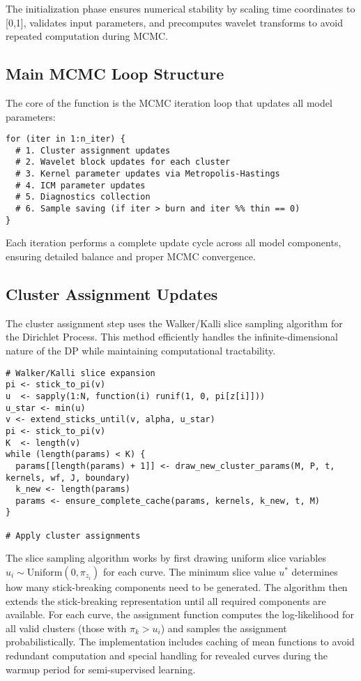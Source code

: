 \documentclass[11pt]{article}
\begin{document}
The initialization phase ensures numerical stability by scaling time coordinates to [0,1], validates input parameters, and precomputes wavelet transforms to avoid repeated computation during MCMC.

\subsection{Main MCMC Loop Structure}

The core of the function is the MCMC iteration loop that updates all model parameters:

\begin{lstlisting}
for (iter in 1:n_iter) {
  # 1. Cluster assignment updates
  # 2. Wavelet block updates for each cluster
  # 3. Kernel parameter updates via Metropolis-Hastings
  # 4. ICM parameter updates
  # 5. Diagnostics collection
  # 6. Sample saving (if iter > burn and iter %% thin == 0)
}
\end{lstlisting}

Each iteration performs a complete update cycle across all model components, ensuring detailed balance and proper MCMC convergence.

\subsection{Cluster Assignment Updates}

The cluster assignment step uses the Walker/Kalli slice sampling algorithm for the Dirichlet Process. This method efficiently handles the infinite-dimensional nature of the DP while maintaining computational tractability.

\begin{lstlisting}
# Walker/Kalli slice expansion
pi <- stick_to_pi(v)
u  <- sapply(1:N, function(i) runif(1, 0, pi[z[i]]))
u_star <- min(u)
v <- extend_sticks_until(v, alpha, u_star)
pi <- stick_to_pi(v)
K  <- length(v)
while (length(params) < K) {
  params[[length(params) + 1]] <- draw_new_cluster_params(M, P, t, kernels, wf, J, boundary)
  k_new <- length(params)
  params <- ensure_complete_cache(params, kernels, k_new, t, M)
}

# Apply cluster assignments
\end{lstlisting}

The slice sampling algorithm works by first drawing uniform slice variables $u_i \sim \text{Uniform}(0, \pi_{z_i})$ for each curve. The minimum slice value $u^*$ determines how many stick-breaking components need to be generated. The algorithm then extends the stick-breaking representation until all required components are available. For each curve, the assignment function computes the log-likelihood for all valid clusters (those with $\pi_k > u_i$) and samples the assignment probabilistically. The implementation includes caching of mean functions to avoid redundant computation and special handling for revealed curves during the warmup period for semi-supervised learning.
\end{document}
